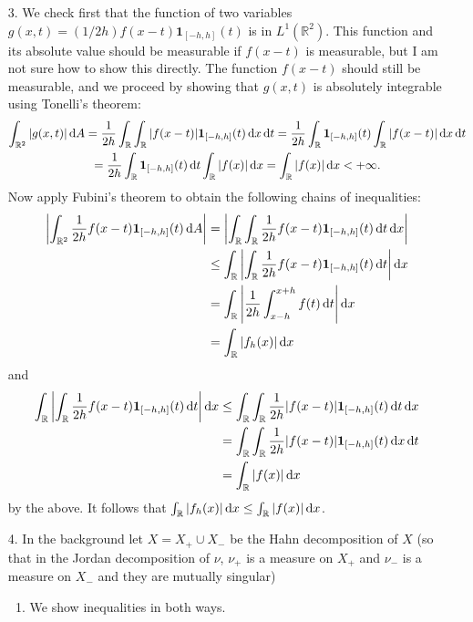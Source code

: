 \documentclass[11pt]{article}
\begin{document}
\begin{enumerate}
  \item[3.] We check first that the function of two variables $g(x,t) = (1/2h)f(x-t)\mathbf{1}_{[-h,h]}(t)$ is in $L^1(\mathbb{R}^2)$. This function and its absolute value should be measurable if $f(x-t)$ is measurable, but I am not sure how to show this directly. The function $f(x-t)$ should still be measurable, and we proceed by showing that $g(x,t)$ is absolutely integrable using Tonelli's theorem: \begin{multline*}
    \int_{\mathbb{R}^2}\abs{g(x,t)}\dd{A} = \frac{1}{2h}\int_\mathbb{R}\int_\mathbb{R}\abs{f(x-t)}\mathbf{1}_{[-h,h]}(t)\dd{x}\dd{t}= \frac{1}{2h}\int_{\mathbb{R}}\mathbf{1}_{[-h,h]}(t)\int_\mathbb{R}\abs{f(x-t)}\dd{x}\dd{t}\\ =\frac{1}{2h}\int_{\mathbb{R}}\mathbf{1}_{[-h,h]}(t)\dd{t}\int_\mathbb{R}\abs{f(x)}\dd{x} = \int_\mathbb{R}\abs{f(x)}\dd{x}<+\infty.
  \end{multline*}
  Now apply Fubini's theorem to obtain the following chains of inequalities: \begin{align*}
    \abs{\int_{\mathbb{R}^2}\frac{1}{2h}f(x-t)\mathbf{1}_{[-h,h]}(t)\dd{A}} &= \abs{\int_{\mathbb{R}}\int_{\mathbb{R}}\frac{1}{2h}f(x-t)\mathbf{1}_{[-h,h]}(t)\dd{t}\dd{x}} \\
    &\leq \int_{\mathbb{R}}\abs{\int_{\mathbb{R}}\frac{1}{2h}f(x-t)\mathbf{1}_{[-h,h]}(t)\dd{t}}\dd{x}\\
    &= \int_\mathbb{R}\abs{\frac{1}{2h}\int_{x-h}^{x+h}f(t)\dd{t}}\dd{x}\\
    &= \int_\mathbb{R}\abs{f_h(x)}\dd{x}
  \end{align*} and \begin{align*}
    \int_{\mathbb{R}}\abs{\int_{\mathbb{R}}\frac{1}{2h}f(x-t)\mathbf{1}_{[-h,h]}(t)\dd{t}}\dd{x} &\leq \int_{\mathbb{R}}\int_{\mathbb{R}}\frac{1}{2h}\abs{f(x-t)}\mathbf{1}_{[-h,h]}(t)\dd{t}\dd{x}\\ 
    &=\int_{\mathbb{R}}\int_{\mathbb{R}}\frac{1}{2h}\abs{f(x-t)}\mathbf{1}_{[-h,h]}(t)\dd{x}\dd{t}\\
    &= \int_\mathbb{R}\abs{f(x)}\dd{x}
  \end{align*} by the above. It follows that $\int_\mathbb{R}\abs{f_h(x)}\dd{x}\leq\int_\mathbb{R}\abs{f(x)}\dd{x}$.
  
  \item[4.] In the background let $X = X_+\cup X_-$ be the Hahn decomposition of $X$ (so that in the Jordan decomposition of $\nu$, $\nu_+$ is a measure on $X_+$ and $\nu_-$ is a measure on $X_-$ and they are mutually singular)\begin{enumerate}
    \item We show inequalities in both ways.
    

\end{enumerate}
\end{enumerate}
\end{document}

